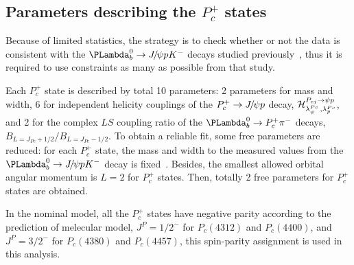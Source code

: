 \subsection{{Parameters describing the $P_c^+$ states}}
\label{sec:Pcpar}
Because of limited statistics, 
the strategy is to check whether or not the data is consistent with the $\Lb\to\jpsi p K^-$ decays studied previously~\supercite{LHCb-PAPER-2019-014}, 
thus it is required to use constraints as many as possible from that study.

Each $P_c^+$ state is described by total 10 parameters: 
2 parameters for mass and width, 
6 for independent helicity couplings of the $P_c^+\to \jpsi p$ decay, 
${\cal H}_{\lambda_\psi^{Pc}\,,\lambda_p^{Pc}}^{P_{cj}\to\psi p}$, 
and 2 for the complex $LS$ coupling ratio of the $\Lb\to P_c^+ \pi^-$ decays, 
$B_{L=J_{Pc}+1/2}/B_{L=J_{Pc}-1/2}$. 
To obtain a reliable fit,  
some free parameters are reduced: 
for each $P_c^+$ state, 
the mass and width to the measured values from the $\Lb\to\jpsi p K^-$ decay is fixed~\supercite{LHCb-PAPER-2019-014}.
Besides,
the smallest allowed orbital angular momentum is $L=2$ for $P_c^+$ states.
Then,
totally 2 free parameters for $P_c^{+}$ states are obtained. 

In the nominal model,
all the $P_c^+$ states have negative parity according to the prediction of melecular model,
$J^{P}=1/2^{-}$ for $P_{c}(4312)$ and $P_{c}(4400)$,
and $J^{P}=3/2^{-}$ for $P_{c}(4380)$ and $P_{c}(4457)$\supercite{LIU2019237},
this spin-parity assignment is used in this analysis.











